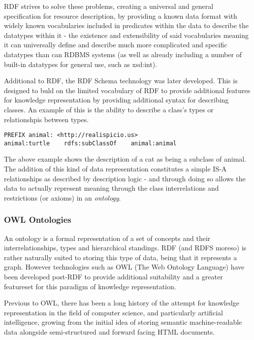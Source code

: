 \documentclass{article}
\begin{document}
RDF strives to solve these problems, creating a universal and general
specification for resource description, by providing a known data format with
widely known vocabularies included in predicates within the data to describe 
the datatypes within it - the existence and extensibility of said vocabularies 
meaning it can universally define and describe much more complicated and 
specific datatypes than can RDBMS systems (as well as already including a number
of built-in datatypes for general use, such as xsd:int).

Additional to RDF, the RDF Schema technology was later developed. This is
designed to buld on the limited vocabulary of RDF to provide additional features
for knowledge representation by providing additional syntax for describing
classes. An example of this is the ability to describe a class's types or
relationshpis between types.

\begin{lstlisting}
PREFIX animal: <http://realispicio.us>
animal:turtle    rdfs:subClassOf    animal:animal
\end{lstlisting}

The above example shows the description of a cat as being a subclass of animal.
The addition of this kind of data representation constitutes a simple IS-A
relationships as described by description logic\cite{desclogic} - and through 
doing so allows the data to actually represent meaning through the class 
interrelations and restrictions (or axioms) in an \emph{ontology}.

\subsubsection{OWL Ontologies}

An ontology is a formal representation of a set of concepts and their
interrelationships, types and hierarchical standings. RDF (and RDFS moreso) is
rather naturally suited to storing this type of data, being that it represents 
a graph. However technologies such as OWL (The Web Ontology Language) have been 
developed post-RDF to provide additional suitability and a greater featureset 
for this paradigm of knowledge representation.

Previous to OWL, there has been a long history of the attempt for knowledge
representation in the field of computer science, and particularly
artificial intelligence, growing from the initial idea of storing semantic
machine-readable data alongside semi-structured and forward facing HTML
documents. 
\end{document}
